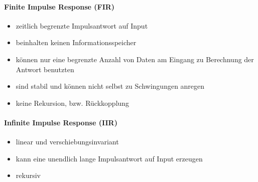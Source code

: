 \documentclass[12pt,a4paper]{article}
\begin{document}
\paragraph{Finite Impulse Response (FIR)}
\hspace{1pt}
\begin{itemize}
\item zeitlich begrenzte Impulsantwort auf Input
\item beinhalten keinen Informationsspeicher
\item können nur eine begrenzte Anzahl von Daten am Eingang zu Berechnung der Antwort benutzten
\item sind stabil und können nicht selbst zu Schwingungen anregen
\item keine Rekursion, bzw. Rückkopplung
\end{itemize}

\paragraph{Infinite Impulse Response (IIR)}
\hspace{1pt}
\begin{itemize}
\item linear und verschiebungsinvariant
\item kann eine unendlich lange Impulsantwort auf Input erzeugen
\item rekursiv
\end{itemize}
\end{document}

